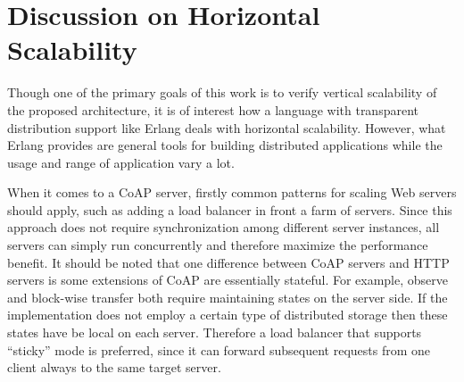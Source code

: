 


\section{Discussion on Horizontal Scalability} \label{horizontal_scale_note}

Though one of the primary goals of this work is to verify vertical scalability of the proposed architecture, it is of interest how a language with transparent distribution support like Erlang deals with horizontal scalability. However, what Erlang provides are general tools for building distributed applications while the usage and range of application vary a lot. 

When it comes to a CoAP server, firstly common patterns for scaling Web servers should apply, such as adding a load balancer in front a farm of servers. Since this approach does not require synchronization among different server instances, all servers can simply run concurrently and therefore maximize the performance benefit. It should be noted that one difference between CoAP servers and HTTP servers is some extensions of CoAP are essentially stateful. For example, observe and block-wise transfer both require maintaining states on the server side. If the implementation does not employ a certain type of distributed storage then these states have be local on each server. Therefore a load balancer that supports ``sticky'' mode is preferred, since it can forward subsequent requests from one client always to the same target server. 

